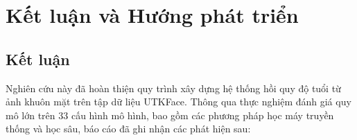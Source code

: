 
\chapter{Kết luận và Hướng phát triển}

\section{Kết luận}
Nghiên cứu này đã hoàn thiện quy trình xây dựng hệ thống hồi quy độ tuổi từ ảnh khuôn mặt trên tập dữ liệu UTKFace. Thông qua thực nghiệm đánh giá quy mô lớn trên 33 cấu hình mô hình, bao gồm các phương pháp học máy truyền thống và học sâu, báo cáo đã ghi nhận các phát hiện sau:

